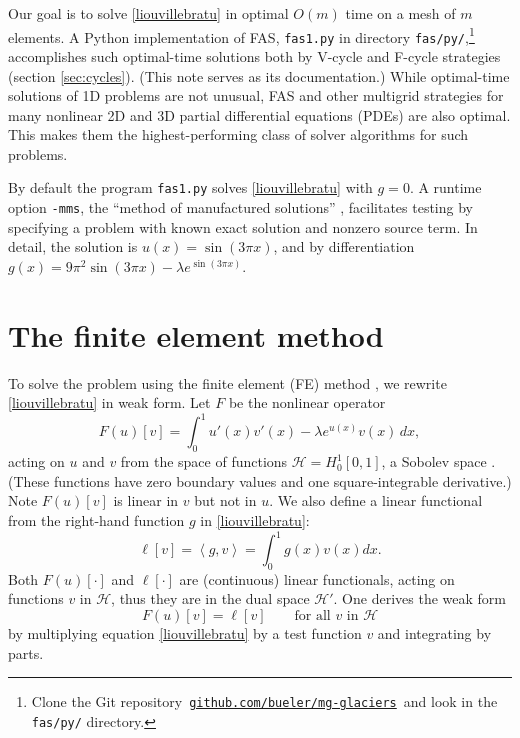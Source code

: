 \documentclass[letterpaper,final,12pt,reqno]{amsart}
\newcommand{\ip}[2]{\left<#1,#2\right>}
\begin{document}
Our goal is to solve \eqref{liouvillebratu} in optimal $O(m)$ time on a mesh of $m$ elements.  A Python implementation of FAS, \texttt{fas1.py} in directory \texttt{fas/py/},\footnote{Clone the Git repository\, \href{https://github.com/bueler/mg-glaciers}{\texttt{github.com/bueler/mg-glaciers}}\, and look in the \texttt{fas/py/} directory.} accomplishes such optimal-time solutions both by V-cycle and F-cycle strategies (section \ref{sec:cycles}).  (This note serves as its documentation.)  While optimal-time solutions of 1D problems are not unusual, FAS and other multigrid strategies for many nonlinear 2D and 3D partial differential equations (PDEs) are also optimal.  This makes them the highest-performing class of solver algorithms for such problems.

By default the program \texttt{fas1.py} solves \eqref{liouvillebratu} with $g=0$.  A runtime option \texttt{-mms}, the ``method of manufactured solutions'' \cite{Bueler2021}, facilitates testing by specifying a problem with known exact solution and nonzero source term.  In detail, the solution is $u(x)=\sin(3\pi x)$, and by differentiation $g(x)=9\pi^2 \sin(3\pi x) - \lambda e^{\sin(3\pi x)}$.


\section{The finite element method}  \label{sec:femethod}

To solve the problem using the finite element (FE) method \cite{Braess2007,Bueler2021,Elmanetal2014}, we rewrite \eqref{liouvillebratu} in weak form.  Let $F$ be the nonlinear operator
\begin{equation}
  F(u)[v] = \int_0^1 u'(x) v'(x) - \lambda e^{u(x)} v(x)\, dx,  \label{operator}
\end{equation}
acting on $u$ and $v$ from the space of functions $\mathcal{H}=H_0^1[0,1]$, a Sobolev space \cite{Evans2010}.  (These functions have zero boundary values and one square-integrable derivative.)  Note $F(u)[v]$ is linear in $v$ but not in $u$.  We also define a linear functional from the right-hand function $g$ in \eqref{liouvillebratu}:
\begin{equation}
  \ell[v] = \ip{g}{v} = \int_0^1 g(x) v(x) dx.  \label{rhsfunctional}
\end{equation}
Both $F(u)[\cdot]$ and $\ell[\cdot]$ are (continuous) linear functionals, acting on functions $v$ in $\mathcal{H}$, thus they are in the dual space $\mathcal{H}'$.  One derives the weak form
\begin{equation}
  F(u)[v] = \ell[v] \qquad \text{for all $v$ in $\mathcal{H}$} \label{weakform}
\end{equation}
by multiplying equation \eqref{liouvillebratu} by a test function $v$ and integrating by parts.
\end{document}
